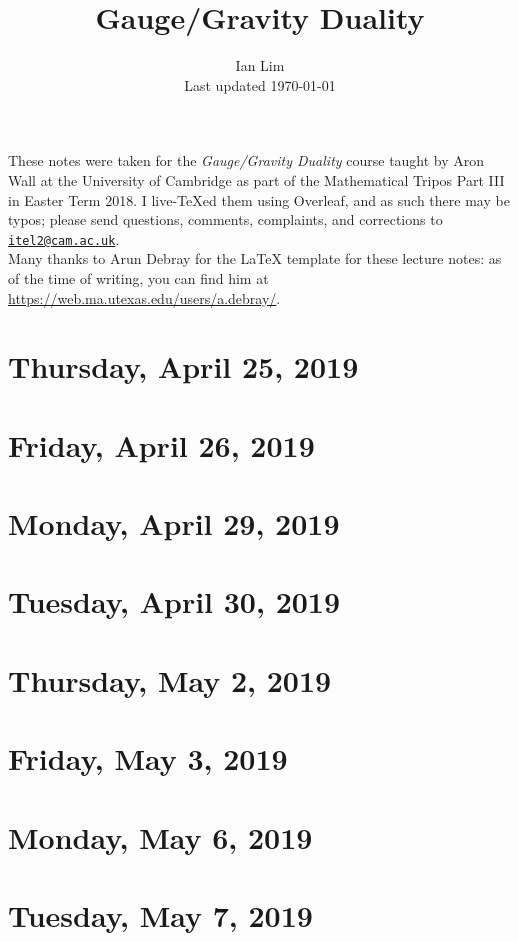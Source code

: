 \documentclass[reqno]{amsart}
\begin{document}
\title{Gauge/Gravity Duality}
\author{Ian Lim\\ Last updated \today}
\maketitle
{\small\noindent These notes were taken for the \textit{Gauge/Gravity Duality} course taught by Aron Wall at the University of Cambridge as part of the Mathematical Tripos Part III in Easter Term 2018. I live-\TeX ed them using Overleaf, and as such there may be typos; please send questions, comments, complaints, and corrections to 
\href{mailto:itel2@cam.ac.uk?subject=GGD\%20Lecture\%20Notes}{\texttt{itel2@cam.ac.uk}}.\\
Many thanks to Arun Debray for the {\LaTeX} template for these lecture notes: as of the time of writing, you can find him at \url{https://web.ma.utexas.edu/users/a.debray/}.}

\tableofcontents

\section{Thursday, April 25, 2019}
	
\section{Friday, April 26, 2019}
	

\section{Monday, April 29, 2019}
    
\section{Tuesday, April 30, 2019}
    
\section{Thursday, May 2, 2019}
    
\section{Friday, May 3, 2019}
    

\section{Monday, May 6, 2019}
    
\section{Tuesday, May 7, 2019}
    
\end{document}
